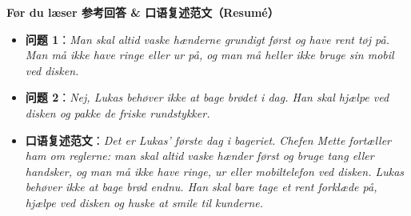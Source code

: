 \begin{answerbox}
\textbf{Før du læser 参考回答 \& 口语复述范文（Resumé）}
\begin{itemize}
  \item \textbf{问题 1}：\textit{Man skal altid vaske hænderne grundigt først og have rent tøj på. Man må ikke have ringe eller ur på, og man må heller ikke bruge sin mobil ved disken.}
  \item \textbf{问题 2}：\textit{Nej, Lukas behøver ikke at bage brødet i dag. Han skal hjælpe ved disken og pakke de friske rundstykker.}
  \item \textbf{口语复述范文}：\textit{Det er Lukas' første dag i bageriet. Chefen Mette fortæller ham om reglerne: man skal altid vaske hænder først og bruge tang eller handsker, og man må ikke have ringe, ur eller mobiltelefon ved disken. Lukas behøver ikke at bage brød endnu. Han skal bare tage et rent forklæde på, hjælpe ved disken og huske at smile til kunderne.}
\end{itemize}
\end{answerbox}
